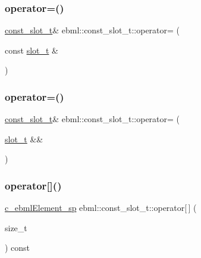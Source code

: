 \mbox{\label{classebml_1_1const__slot__t_acc0413803e05c5e0c30769fd3ac7ada9}} 
\subsubsection{\texorpdfstring{operator=()}{operator=()}\hspace{0.1cm}{\footnotesize\ttfamily [3/4]}}
{\footnotesize\ttfamily \mbox{\hyperlink{classebml_1_1const__slot__t}{const\+\_\+slot\+\_\+t}}\& ebml\+::const\+\_\+slot\+\_\+t\+::operator= (\begin{DoxyParamCaption}\item[{const \mbox{\hyperlink{classebml_1_1slot__t}{slot\+\_\+t}} \&}]{ }\end{DoxyParamCaption})}

\mbox{\label{classebml_1_1const__slot__t_aca8bbae51d5729db43bc5e089774e3d2}} 
\subsubsection{\texorpdfstring{operator=()}{operator=()}\hspace{0.1cm}{\footnotesize\ttfamily [4/4]}}
{\footnotesize\ttfamily \mbox{\hyperlink{classebml_1_1const__slot__t}{const\+\_\+slot\+\_\+t}}\& ebml\+::const\+\_\+slot\+\_\+t\+::operator= (\begin{DoxyParamCaption}\item[{\mbox{\hyperlink{classebml_1_1slot__t}{slot\+\_\+t}} \&\&}]{ }\end{DoxyParamCaption})}

\mbox{\label{classebml_1_1const__slot__t_a4706154c749a53f737edb8aa4ff121bd}} 
\subsubsection{\texorpdfstring{operator[]()}{operator[]()}}
{\footnotesize\ttfamily \mbox{\hyperlink{namespaceebml_a2deef4e8071531b32e3533f1bf978917}{c\+\_\+ebml\+Element\+\_\+sp}} ebml\+::const\+\_\+slot\+\_\+t\+::operator\mbox{[}$\,$\mbox{]} (\begin{DoxyParamCaption}\item[{size\+\_\+t}]{ }\end{DoxyParamCaption}) const}



